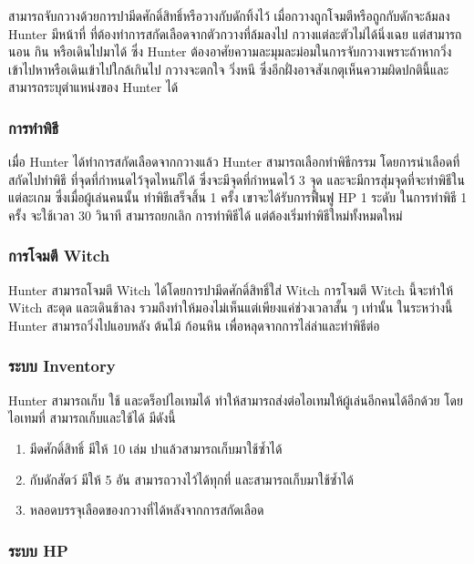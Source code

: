 สามารถจับกวางด้วยการปามีดศักดิ์สิทธิ์หรือวางกับดักทิ้งไว้ เมื่อกวางถูกโจมตีหรือถูกกับดักจะล้มลง Hunter มีหน้าที่
ที่ต้องทำการสกัดเลือดจากตัวกวางที่ล้มลงไป กวางแต่ละตัวไม่ได้นิ่งเฉย แต่สามารถนอน กิน หรือเดินไปมาได้ ซึ่ง
Hunter ต้องอาศัยความละมุมละม่อมในการจับกวางเพราะถ้าหากวิ่งเข้าไปหาหรือเดินเข้าไปใกล้เกินไป กวางจะตกใจ
วิ่งหนี ซึ่งอีกฝั่งอาจสังเกตุเห็นความผิดปกตินี้และสามารถระบุตำแหน่งของ Hunter ได้

\subsubsection{การทำพิธี}

เมื่อ Hunter ได้ทำการสกัดเลือดจากกวางแล้ว Hunter สามารถเลือกทำพิธีกรรม โดยการนำเลือดที่สกัดไปทำพิธี
ที่จุดที่กำหนดไว้จุดไหนก็ได้ ซึ่งจะมีจุดที่กำหนดไว้ 3 จุด และจะมีการสุ่มจุดที่จะทำพิธีในแต่ละเกม ซึ่งเมื่อผู้เล่นคนนั้น
ทำพิธีเสร็จสิ้น 1 ครั้ง เขาจะได้รับการฟื้นฟู HP 1 ระดับ ในการทำพิธี 1 ครั้ง จะใช้เวลา 30 วินาที สามารถยกเลิก
การทำพิธีได้ แต่ต้องเริ่มทำพิธีใหม่ทั้งหมดใหม่

\subsubsection{การโจมตี Witch}

Hunter สามารถโจมตี Witch ได้โดยการปามีดศักดิ์สิทธิ์ใส่ Witch การโจมตี Witch นี้จะทำให้ Witch สะดุด
และเดินช้าลง รวมถึงทำให้มองไม่เห็นแต่เพียงแค่ช่วงเวลาสั้น ๆ เท่านั้น ในระหว่างนี้ Hunter สามารถวิ่งไปแอบหลัง
ต้นไม้ ก้อนหิน เพื่อหลุดจากการไล่ล่าและทำพิธีต่อ

\subsubsection{ระบบ Inventory}

Hunter สามารถเก็บ ใช้ และดร็อปไอเทมได้ ทำให้สามารถส่งต่อไอเทมให้ผู้เล่นอีกคนได้อีกด้วย โดยไอเทมที่
สามารถเก็บและใช้ได้ มีดังนี้
\begin{enumerate}
  \item มีดศักดิ์สิทธิ์ มีให้ 10 เล่ม ปาแล้วสามารถเก็บมาใช้ซ้ำได้
  \item กับดักสัตว์ มีให้ 5 อัน สามารถวางไว้ได้ทุกที่ และสามารถเก็บมาใช้ซ้ำได้
  \item หลอดบรรจุเลือดของกวางที่ได้หลังจากการสกัดเลือด
\end{enumerate}

\subsubsection{ระบบ HP}

